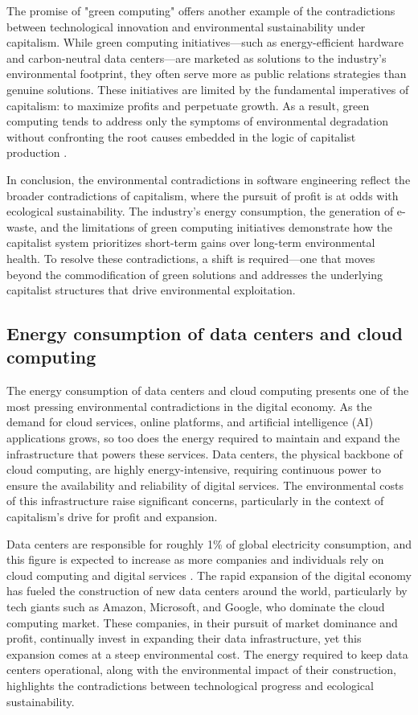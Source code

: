 The promise of "green computing" offers another example of the contradictions between technological innovation and environmental sustainability under capitalism. While green computing initiatives—such as energy-efficient hardware and carbon-neutral data centers—are marketed as solutions to the industry’s environmental footprint, they often serve more as public relations strategies than genuine solutions. These initiatives are limited by the fundamental imperatives of capitalism: to maximize profits and perpetuate growth. As a result, green computing tends to address only the symptoms of environmental degradation without confronting the root causes embedded in the logic of capitalist production \cite[pp.~75-78]{mazzucato2020}. 

In conclusion, the environmental contradictions in software engineering reflect the broader contradictions of capitalism, where the pursuit of profit is at odds with ecological sustainability. The industry's energy consumption, the generation of e-waste, and the limitations of green computing initiatives demonstrate how the capitalist system prioritizes short-term gains over long-term environmental health. To resolve these contradictions, a shift is required—one that moves beyond the commodification of green solutions and addresses the underlying capitalist structures that drive environmental exploitation.

\subsection{Energy consumption of data centers and cloud computing}

The energy consumption of data centers and cloud computing presents one of the most pressing environmental contradictions in the digital economy. As the demand for cloud services, online platforms, and artificial intelligence (AI) applications grows, so too does the energy required to maintain and expand the infrastructure that powers these services. Data centers, the physical backbone of cloud computing, are highly energy-intensive, requiring continuous power to ensure the availability and reliability of digital services. The environmental costs of this infrastructure raise significant concerns, particularly in the context of capitalism’s drive for profit and expansion.

Data centers are responsible for roughly 1\% of global electricity consumption, and this figure is expected to increase as more companies and individuals rely on cloud computing and digital services \cite[pp.~7-9]{masanet2020}. The rapid expansion of the digital economy has fueled the construction of new data centers around the world, particularly by tech giants such as Amazon, Microsoft, and Google, who dominate the cloud computing market. These companies, in their pursuit of market dominance and profit, continually invest in expanding their data infrastructure, yet this expansion comes at a steep environmental cost. The energy required to keep data centers operational, along with the environmental impact of their construction, highlights the contradictions between technological progress and ecological sustainability.

